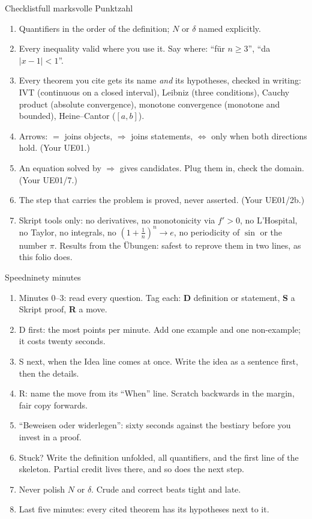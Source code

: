 \documentclass{kaelearn}
\begin{document}
\begin{panel}[unbreakable]{Checklist}{full marks}{volle Punktzahl}
\begin{enumerate}
  \item Quantifiers in the order of the definition; $N$ or $\delta$ named explicitly.
  \item Every inequality valid where you use it. Say where: ``für $n\ge3$'', ``da $|x-1|<1$''.
  \item Every theorem you cite gets its name \emph{and} its hypotheses, checked in writing: IVT (continuous on a closed
        interval), Leibniz (three conditions), Cauchy product (absolute convergence), monotone convergence (monotone and
        bounded), Heine--Cantor ($[a,b]$).
  \item Arrows: $=$ joins objects, $\Rightarrow$ joins statements, $\iff$ only when both directions hold. (Your UE01.)
  \item An equation solved by $\Rightarrow$ gives candidates. Plug them in, check the domain. (Your UE01/7.)
  \item The step that carries the problem is proved, never asserted. (Your UE01/2b.)
  \item Skript tools only: no derivatives, no monotonicity via $f'>0$, no L'Hospital, no Taylor, no integrals, no
        $(1+\frac1n)^n\to e$, no periodicity of $\sin$ or the number $\pi$. Results from the Übungen: safest to reprove them in
        two lines, as this folio does.
\end{enumerate}
\end{panel}

\begin{panel}[unbreakable]{Speed}{ninety minutes}{}
\begin{enumerate}
  \item Minutes 0--3: read every question. Tag each: \textbf{D} definition or statement, \textbf{S} a Skript proof, \textbf{R} a
        move.
  \item D first: the most points per minute. Add one example and one non-example; it costs twenty seconds.
  \item S next, when the Idea line comes at once. Write the idea as a sentence first, then the details.
  \item R: name the move from its ``When'' line. Scratch backwards in the margin, fair copy forwards.
  \item ``Beweisen oder widerlegen'': sixty seconds against the bestiary before you invest in a proof.
  \item Stuck? Write the definition unfolded, all quantifiers, and the first line of the skeleton. Partial credit lives there,
        and so does the next step.
  \item Never polish $N$ or $\delta$. Crude and correct beats tight and late.
  \item Last five minutes: every cited theorem has its hypotheses next to it.
\end{enumerate}
\end{panel}
\end{document}

